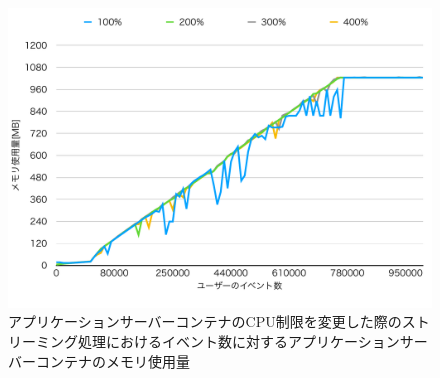 \documentclass[../../../../../main]{subfiles}
\begin{document}
    \begin{figure}[H]
        \centering
        \includegraphics[width=12cm]{graph}
        \caption{アプリケーションサーバーコンテナのCPU制限を変更した際のストリーミング処理におけるイベント数に対するアプリケーションサーバーコンテナのメモリ使用量}
        \label{fig:stream-change-cpu-limit-app-memory-app_1024-db_1_1024}
    \end{figure}
\end{document}
